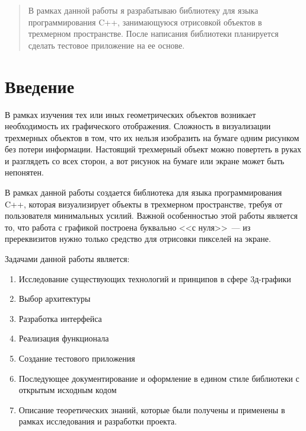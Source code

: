 \documentclass{article}
\begin{document}
\makeTitlePage

\tableofcontents

\begin{abstract}
В рамках данной работы я разрабатываю библиотеку для языка программирования C++, занимающуюся отрисовкой объектов в трехмерном пространстве. После написания библиотеки планируется сделать тестовое приложение на ее основе.
\end{abstract}

\newpage

\section{Введение}

В рамках изучения тех или иных геометрических объектов возникает необходимость их графического отображения. Сложность в визуализации трехмерных объектов в том, что их нельзя изобразить на бумаге одним рисунком без потери информации. Настоящий трехмерный объект можно повертеть в руках и разглядеть со всех сторон, а вот рисунок на бумаге или экране может быть непонятен.

В рамках данной работы создается библиотека для языка программирования C++, которая визуализирует объекты в трехмерном пространстве, требуя от пользователя минимальных усилий. Важной особенностью этой работы является то, что работа с графикой построена буквально <<с нуля>>~--- из пререквизитов нужно только средство для отрисовки пикселей на экране.

Задачами данной работы является:

\begin{enumerate}
\item Исследование существующих технологий и принципов в сфере 3д-графики
\item Выбор архитектуры
\item Разработка интерфейса
\item Реализация функционала
\item Создание тестового приложения
\item Последующее документирование и оформление в едином стиле библиотеки с открытым исходным кодом
\item Описание теоретических знаний, которые были получены и применены в рамках исследования и разработки проекта.
\end{enumerate}
\end{document}
